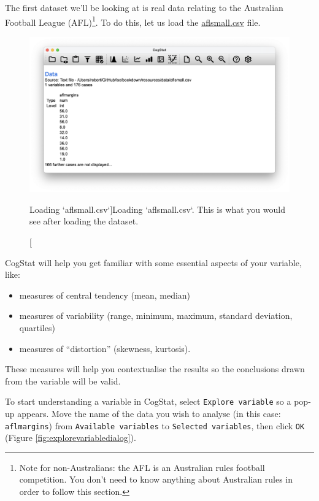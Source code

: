 \documentclass[
  11pt,
]{book}
\providecommand{\tightlist}{%
  \setlength{\itemsep}{0pt}\setlength{\parskip}{0pt}}
\theoremstyle{definition}
\theoremstyle{definition}
\theoremstyle{definition}
\theoremstyle{definition}
\theoremstyle{remark}
\begin{document}
The first dataset we'll be looking at is real data relating to the Australian Football League (AFL)\footnote{Note for non-Australians: the AFL is an Australian rules football competition. You don't need to know anything about Australian rules in order to follow this section.}. To do this, let us load the \href{resources/data/aflsmall.csv}{aflsmall.csv} file.

\begin{figure}

{\centering \includegraphics[width=0.66\linewidth]{resources/image/loadaflsmall} 

}

\caption[Loading `aflsmall.csv`]{Loading `aflsmall.csv`. This is what you would see after loading the dataset.}\label{fig:loadaflsmall}
\end{figure}

CogStat will help you get familiar with some essential aspects of your variable, like:

\begin{itemize}
\tightlist
\item
  measures of central tendency (mean, median)
\item
  measures of variability (range, minimum, maximum, standard deviation, quartiles)
\item
  measures of ``distortion'' (skewness, kurtosis).
\end{itemize}

These measures will help you contextualise the results so the conclusions drawn from the variable will be valid.

To start understanding a variable in CogStat, select \texttt{Explore\ variable} so a pop-up appears. Move the name of the data you wish to analyse (in this case: \texttt{aflmargins}) from \texttt{Available\ variables} to \texttt{Selected\ variables}, then click \texttt{OK} (Figure \ref{fig:explorevariabledialog}).
\end{document}

